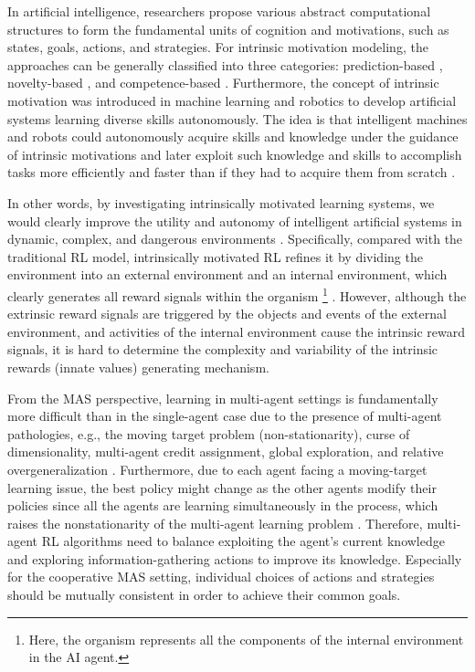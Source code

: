 \documentclass[letterpaper]{article} %
\begin{document}
In artificial intelligence, researchers propose various abstract computational structures to form the fundamental units of cognition and motivations, such as states, goals, actions, and strategies. For intrinsic motivation modeling, the approaches can be generally classified into three categories: prediction-based \cite{schmidhuber1991curious,schmidhuber2010formal}, novelty-based \cite{marsland2000real,merrick2009motivated}, and competence-based \cite{barto2004intrinsically,schembri2007evolution}. Furthermore, the concept of intrinsic motivation was introduced in machine learning and robotics to develop artificial systems learning diverse skills autonomously. The idea is that intelligent machines and robots could autonomously acquire skills and knowledge under the guidance of intrinsic motivations and later exploit such knowledge and skills to accomplish tasks more efficiently and faster than if they had to acquire them from scratch \cite{baldassarre2013intrinsically}. 

In other words, by investigating intrinsically motivated learning systems, we would clearly improve the utility and autonomy of intelligent artificial systems in dynamic, complex, and dangerous environments \cite{yang2023hierarchical,yang2022game}. Specifically, compared with the traditional RL model, intrinsically motivated RL refines it by dividing the environment into an external environment and an internal environment, which clearly generates all reward signals within the organism \footnote{Here, the organism represents all the components of the internal environment in the AI agent.} \cite{baldassarre2013intrinsically}. However, although the extrinsic reward signals are triggered by the objects and events of the external environment, and activities of the internal environment cause the intrinsic reward signals, it is hard to determine the complexity and variability of the intrinsic rewards (innate values) generating mechanism.

From the MAS perspective, learning in multi-agent settings is fundamentally more difficult than in the single-agent case due to the presence of multi-agent pathologies, e.g., the moving target problem (non-stationarity), curse of dimensionality, multi-agent credit assignment, global exploration, and relative overgeneralization \cite{hernandez2019survey}. Furthermore, due to each agent facing a moving-target learning issue, the best policy might change as the other agents modify their policies since all the agents are learning simultaneously in the process, which raises the nonstationarity of the multi-agent learning problem \cite{busoniu2008comprehensive}. Therefore, multi-agent RL algorithms need to balance exploiting the agent's current knowledge and exploring information-gathering actions to improve its knowledge. Especially for the cooperative MAS setting, individual choices of actions and strategies should be mutually consistent in order to achieve their common goals.
\end{document}
